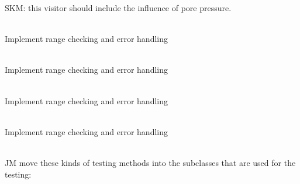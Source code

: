 \begin{DoxyRefList}
\label{todo__todo000221}%
%
SKM\+: this visitor should include the influence of pore pressure. 
\item[Member \doxylink{classcsmp_1_1_na_cl_boiling_curve_a6497bc9ef5d2d77a6a0a9b100955a1f3}{csmp\+::Na\+Cl\+Boiling\+Curve\+::Vapor\+Pressure} ()]\hfill \\
\label{todo__todo000057}%
%
Implement range checking and error handling  
\item[Member \doxylink{classcsmp_1_1_na_cl_melting_curve_a8035debd234cfc73b89e30a20621124a}{csmp\+::Na\+Cl\+Melting\+Curve\+::Pmelt\+FromT} ()]\hfill \\
\label{todo__todo000059}%
%
Implement range checking and error handling  
\item[Member \doxylink{classcsmp_1_1_na_cl_melting_curve_ae563e739088b850cdd8ef04d24ce0601}{csmp\+::Na\+Cl\+Melting\+Curve\+::Tmelt\+FromP} ()]\hfill \\
\label{todo__todo000058}%
%
Implement range checking and error handling  
\item[Member \doxylink{classcsmp_1_1_na_cl_sublimation_curve_a22286f2ffa64a8e6c272d0a5b144858f}{csmp\+::Na\+Cl\+Sublimation\+Curve\+::Vapor\+Pressure} ()]\hfill \\
\label{todo__todo000060}%
%
Implement range checking and error handling  
\item[Member \doxylink{classcsmp_1_1_node_centered_finite_volume_algorithm_a5207672f7ec8fd564d09bc3e736b2ab6}{csmp\+::Node\+Centered\+Finite\+Volume\+Algorithm\texorpdfstring{$<$}{<} dim \texorpdfstring{$>$}{>}\+::Output\+Results\+\_\+\+Nonlinear\+Newton\+Raphson} (const \doxylink{classcsmp_1_1_property_database}{Property\+Database$<$ dim $>$} \&, size\+\_\+t result\+\_\+phase, const \doxylink{structcsmp_1_1_index}{csmp\+::\+Index} \&adv1\+\_\+key, const \doxylink{structcsmp_1_1_index}{csmp\+::\+Index} \&adv2\+\_\+key, bool show\+\_\+range)]\hfill \\
\label{todo__todo000096}%
%
JM move these kinds of testing methods into the subclasses that are used for the testing\+:


\end{DoxyRefList}
